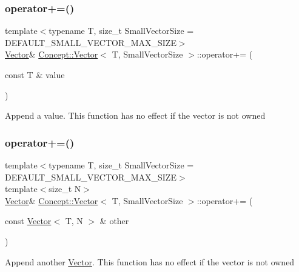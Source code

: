 \subsubsection{\texorpdfstring{operator+=()}{operator+=()}\hspace{0.1cm}{\footnotesize\ttfamily [1/2]}}
{\footnotesize\ttfamily template$<$typename T, size\+\_\+t Small\+Vector\+Size = D\+E\+F\+A\+U\+L\+T\+\_\+\+S\+M\+A\+L\+L\+\_\+\+V\+E\+C\+T\+O\+R\+\_\+\+M\+A\+X\+\_\+\+S\+I\+ZE$>$ \\
\mbox{\hyperlink{class_concept_1_1_vector}{Vector}}\& \mbox{\hyperlink{class_concept_1_1_vector}{Concept\+::\+Vector}}$<$ T, Small\+Vector\+Size $>$\+::operator+= (\begin{DoxyParamCaption}\item[{const T \&}]{value }\end{DoxyParamCaption})\hspace{0.3cm}{\ttfamily [inline]}}

Append a value. This function has no effect if the vector is not owned \mbox{\label{class_concept_1_1_vector_ab05ae64ae1973bf0c115575cadd2ebd8}} 
\subsubsection{\texorpdfstring{operator+=()}{operator+=()}\hspace{0.1cm}{\footnotesize\ttfamily [2/2]}}
{\footnotesize\ttfamily template$<$typename T, size\+\_\+t Small\+Vector\+Size = D\+E\+F\+A\+U\+L\+T\+\_\+\+S\+M\+A\+L\+L\+\_\+\+V\+E\+C\+T\+O\+R\+\_\+\+M\+A\+X\+\_\+\+S\+I\+ZE$>$ \\
template$<$size\+\_\+t N$>$ \\
\mbox{\hyperlink{class_concept_1_1_vector}{Vector}}\& \mbox{\hyperlink{class_concept_1_1_vector}{Concept\+::\+Vector}}$<$ T, Small\+Vector\+Size $>$\+::operator+= (\begin{DoxyParamCaption}\item[{const \mbox{\hyperlink{class_concept_1_1_vector}{Vector}}$<$ T, N $>$ \&}]{other }\end{DoxyParamCaption})\hspace{0.3cm}{\ttfamily [inline]}}

Append another \mbox{\hyperlink{class_concept_1_1_vector}{Vector}}. This function has no effect if the vector is not owned \mbox{\label{class_concept_1_1_vector_a0ea691819713d696baa31ddba1240f13}} 
